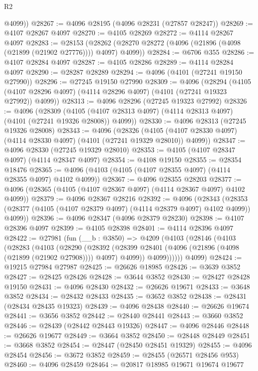 \begin{lexlean}{R2}
\begin{coremodule}
        @4099))
@28267 := @4096 @28195 (@4096 @28231 (@27857 @28247))
@28269 := @4107 @28267 @4097
@28270 := @4105 @28269
@28272 := @4114 @28267 @4097
@28283 := @28153
    (@28262 (@28270 @28272 (@4096 (@21896 (@4098 (@21899 (@21902 @27776)))) @4097) @4099))
@28284 := @6706 @355
@28286 := @4107 @28284 @4097
@28287 := @4105 @28286
@28289 := @4114 @28284 @4097
@28290 := @28287 @28289
@28294 := @4096 (@4101 (@27241 @19150 @27990))
@28296 := @27245 @19150 @27990
@28309 := @4096
    (@28294 (@4105 (@4107 @28296 @4097) (@4114 @28296 @4097) (@4101 (@27241 @19323 @27992)) @4099))
@28313 := @4096 @28296 (@27245 @19323 @27992)
@28326 := @4096
    (@28309 (@4105 (@4107 @28313 @4097) (@4114 @28313 @4097) (@4101 (@27241 @19326 @28008)) @4099))
@28330 := @4096 @28313 (@27245 @19326 @28008)
@28343 := @4096
    (@28326 (@4105 (@4107 @28330 @4097) (@4114 @28330 @4097) (@4101 (@27241 @19329 @28010)) @4099))
@28347 := @4096 @28330 (@27245 @19329 @28010)
@28353 := @4105 (@4107 @28347 @4097) (@4114 @28347 @4097)
@28354 := @4108 @19150
@28355 := @28354 @18476
@28365 := @4096 (@4103 (@4105 (@4107 @28355 @4097) (@4114 @28355 @4097) @4102 @4099))
@28367 := @4096 @28355 @28203
@28377 := @4096 (@28365 (@4105 (@4107 @28367 @4097) (@4114 @28367 @4097) @4102 @4099))
@28379 := @4096 @28367 @28216
@28392 := @4096
    (@28343 (@28353 (@28377 (@4105 (@4107 @28379 @4097) (@4114 @28379 @4097) @4102 @4099)) @4099))
@28396 := @4096 @28347 (@4096 @28379 @28230)
@28398 := @4107 @28396 @4097
@28399 := @4105 @28398
@28401 := @4114 @28396 @4097
@28422 := @27981
    (fun (__b : @3850) =>
    @4209
      (@4103
        (@28146
          (@4103
            (@28283
              (@4103
                (@28290
                  (@28392
                    (@28399 @28401 (@4096 (@21896 (@4098 (@21899 (@21902 @27908)))) @4097) @4099))
                  @4099))))))
      @4099)
@28424 := @19215 @27984 @27987
@28425 := @26626 @18985
@28426 := @3639 @3852
@28427 := @28425 @28426
@28428 := @3644 @3852
@28430 := @28427 @28428 @19150
@28431 := @4096 @28430
@28432 := @26626 @19671
@28433 := @3648 @3852
@28434 := @28432 @28433
@28435 := @3652 @3852
@28438 := @28431 (@28434 @28435 @19323)
@28439 := @4096 @28438
@28440 := @26626 @19674
@28441 := @3656 @3852
@28442 := @28440 @28441
@28443 := @3660 @3852
@28446 := @28439 (@28442 @28443 @19326)
@28447 := @4096 @28446
@28448 := @26626 @19677
@28449 := @3664 @3852
@28450 := @28448 @28449
@28451 := @3668 @3852
@28454 := @28447 (@28450 @28451 @19329)
@28455 := @4096 @28454
@28456 := @3672 @3852
@28459 := @28455 (@26571 @28456 @953)
@28460 := @4096 @28459
@28464 := @20817 @18985 @19671 @19674 @19677

\end{coremodule}
\end{lexlean}
